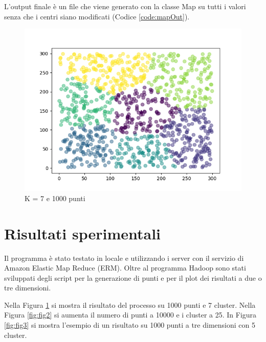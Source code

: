 \documentclass[10pt,twocolumn,letterpaper]{article}
\begin{document}
        

        L'output finale è un file che viene generato con la classe Map su tutti
        i valori senza che i centri siano modificati (Codice \ref{code:mapOut}).\\

        

        \begin{figure}
            \centering
            \includegraphics[width=\linewidth]{../img/2d.png}
            \caption{K = 7 e 1000 punti}
            \label{fig:fig1}
        \end{figure}
\section{Risultati sperimentali}
\label{test}
    Il programma è stato testato in locale e utilizzando i server con il servizio
    di Amazon Elastic Map Reduce (ERM).
    Oltre al programma Hadoop sono stati sviluppati degli script per la generazione
    di punti e per il plot dei risultati a due o tre dimensioni.

    Nella Figura \ref{fig:fig1} si mostra il risultato del processo su 1000 punti e
    7 cluster. Nella Figura \ref{fig:fig2} si aumenta il numero di punti a 10000 e i
    cluster a 25. In Figura \ref{fig:fig3} si mostra l'esempio di un risultato su 1000 punti
    a tre dimensioni con 5 cluster.
\end{document}
